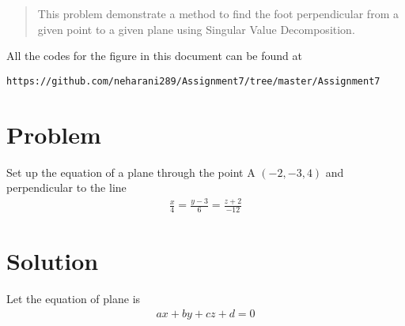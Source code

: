 \documentclass[journal,12pt,twocolumn]{IEEEtran}
\begin{document}
	
	\maketitle
	\newpage
	\bigskip
	\renewcommand{\thefigure}{\theenumi}
	\renewcommand{\thetable}{\theenumi}
	\date{Today}
	
\begin{abstract}
This problem demonstrate a method to  find the foot perpendicular  from a given point to a given plane using Singular Value Decomposition.
\end{abstract}
All the codes for the figure in this document can be found at
\begin{lstlisting}
https://github.com/neharani289/Assignment7/tree/master/Assignment7
\end{lstlisting}
\section{\textbf{Problem}}
Set up the equation of a plane through the point A $\left(-2, -3, 4 \right)$ and perpendicular to the line 
\begin{align}
\frac{x}{4} = \frac{y - 3}{6} = \frac{z+2}{-12} \label{eq1.1}
\end{align}
 \section{\textbf{Solution}} 
 Let the equation of plane is 
 \begin{align}
 ax +by +cz +d = 0 \label{eq2.1}
 \end{align}
 
\end{document}
